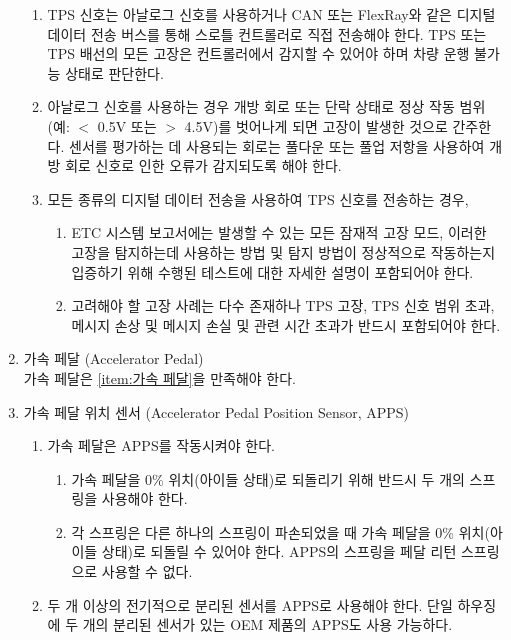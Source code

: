 \documentclass[final,a4paper,10pt]{report}
\begin{document}
\begin{enumerate}
\begin{enumerate}
      \item TPS 신호는 아날로그 신호를 사용하거나 CAN 또는 FlexRay와 같은 디지털 데이터 전송 버스를 통해 스로틀 컨트롤러로 직접 전송해야 한다. TPS 또는 TPS 배선의 모든 고장은 컨트롤러에서 감지할 수 있어야 하며 차량 운행 불가능 상태로 판단한다.
      \item 아날로그 신호를 사용하는 경우 개방 회로 또는 단락 상태로 정상 작동 범위(예: $<$ 0.5V 또는 $>$ 4.5V)를 벗어나게 되면 고장이 발생한 것으로 간주한다. 센서를 평가하는 데 사용되는 회로는 풀다운 또는 풀업 저항을 사용하여 개방 회로 신호로 인한 오류가 감지되도록 해야 한다.
      
      \item 모든 종류의 디지털 데이터 전송을 사용하여 TPS 신호를 전송하는 경우,
        \begin{enumerate}
          \item ETC 시스템 보고서에는 발생할 수 있는 모든 잠재적 고장 모드, 이러한 고장을 탐지하는데 사용하는 방법 및 탐지 방법이 정상적으로 작동하는지 입증하기 위해 수행된 테스트에 대한 자세한 설명이 포함되어야 한다.
          \item 고려해야 할 고장 사례는 다수 존재하나 TPS 고장, TPS 신호 범위 초과, 메시지 손상 및 메시지 손실 및 관련 시간 초과가 반드시 포함되어야 한다.
        \end{enumerate}
    \end{enumerate}
    
  \item 가속 페달 (Accelerator Pedal)\\
    가속 페달은 \cref{item:가속 페달}을 만족해야 한다.
    
  \item 가속 페달 위치 센서 (Accelerator Pedal Position Sensor, APPS)
    \begin{enumerate}
      \item 가속 페달은 APPS를 작동시켜야 한다.
        \begin{enumerate}
          \item 가속 페달을 0\% 위치(아이들 상태)로 되돌리기 위해 반드시 두 개의 스프링을 사용해야 한다.
          \item 각 스프링은 다른 하나의 스프링이 파손되었을 때 가속 페달을 0\% 위치(아이들 상태)로 되돌릴 수 있어야 한다. APPS의 스프링을 페달 리턴 스프링으로 사용할 수 없다.
        \end{enumerate}
        
      \item 두 개 이상의 전기적으로 분리된 센서를 APPS로 사용해야 한다. 단일 하우징에 두 개의 분리된 센서가 있는 OEM 제품의 APPS도 사용 가능하다.
    \end{enumerate}
    

\end{enumerate}
\end{document}
